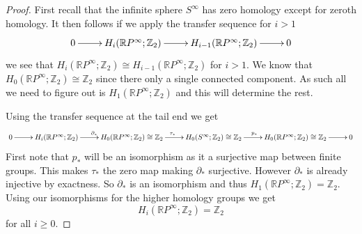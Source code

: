 \documentclass[10pt]{article}
\newcommand{\bb}[1]{\mathbb{#1}}
\theoremstyle{plain}
\theoremstyle{remark}
\begin{document}
\begin{proof}
  First recall that the infinite sphere $S^\infty$ has zero homology except
  for zeroth homology. It then follows if we apply the transfer sequence
  for $i>1$
  \[
    \xymatrix{
      0 \ar[r] & H_i(\bb{R}P^\infty;\bb{Z}_2) \ar[r] & H_{i-1}(\bb{R}P^\infty;\bb{Z}_2) \ar[r] & 0
    }
  \]
  we see that $H_i(\bb{R}P^\infty;\bb{Z}_2)\cong H_{i-1}(\bb{R}P^\infty;\bb{Z}_2)$ for $i>1$.
  We know that $H_0(\bb{R}P^\infty;\bb{Z}_2)\cong \bb{Z}_2$ since there only a single
  connected component. As such all we need to figure out is $H_1(\bb{R}P^\infty;\bb{Z}_2)$
  and this will determine the rest.

  Using the transfer sequence at the tail end we get
  \[
    \xymatrix{
      0 \ar[r] & H_i(\bb{R}P^\infty;\bb{Z}_2) \ar[r]^{\partial_*} & H_0(\bb{R}P^\infty;\bb{Z}_2)\cong\bb{Z}_2 \ar[r]^{\tau_*} & H_0(S^\infty;\bb{Z}_2)\cong\bb{Z}_2 \ar[r]^{p_*} & H_0(\bb{R}P^\infty;\bb{Z}_2)\cong\bb{Z}_2 \ar[r] & 0
    }
  \]
  First note that $p_*$ will be an isomorphism as it a surjective map between
  finite groups. This makes $\tau_*$ the zero map making $\partial_*$ surjective.
  However $\partial_*$ is already injective by exactness. So $\partial_*$ is an isomorphism
  and thus $H_1(\bb{R}P^\infty;\bb{Z}_2)=\bb{Z}_2$. Using our isomorphisms for the
  higher homology groups we get
  \[
    H_i(\bb{R}P^\infty;\bb{Z}_2) = \bb{Z}_2
  \]
  for all $i\geq 0$.
\end{proof}

\end{document}
